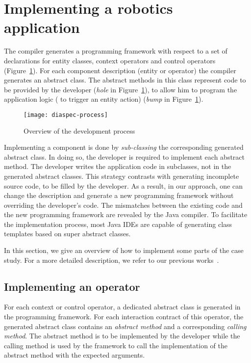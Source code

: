 
\section{Implementing a robotics application}
\label{sec:implementing}

The \diaspec{} compiler generates a programming framework with respect
to a set of declarations for entity classes, context operators and
control operators (Figure~\ref{fig:diaspec-process}). For each
component description (entity or operator) the compiler generates an
abstract class. The abstract methods in this class represent code to
be provided by the developer (\emph{hole} in
Figure~\ref{fig:diaspec-process}), to allow him to program the
application logic (\eg{} to trigger an entity action) (\textit{bump}
in Figure~\ref{fig:diaspec-process}).

\begin{figure}[ht]
  \centering
  \texttt{[image: diaspec-process]}
  \caption{Overview of the \diaspec{} development process}
  \label{fig:diaspec-process}
\end{figure}

Implementing a \diaspec{} component is done by \textit{sub-classing}
the corresponding generated abstract class. In doing so, the developer
is required to implement each abstract method. The developer writes
the application code in subclasses, not in the generated abstract
classes. This strategy contrasts with generating incomplete source
code, to be filled by the developer. As a result, in our approach, one
can change the \diaspec{} description and generate a new programming
framework without overriding the developer's code. The mismatches
between the existing code and the new programming framework are
revealed by the Java compiler. To facilitate the implementation
process, most Java IDEs are capable of generating class templates
based on super abstract classes.

In this section, we give an overview of how to implement some parts of
the case study. For a more detailed description, we refer to our
previous works~\cite{Cass09b,Cass11a,Cass11b}.

\subsection{Implementing an operator}

For each context or control operator, a dedicated abstract class is
generated in the programming framework. For each interaction contract
of this operator, the generated abstract class contains an
\emph{abstract method} and a corresponding \emph{calling method}. The
abstract method is to be implemented by the developer while the
calling method is used by the framework to call the implementation of
the abstract method with the expected arguments.

